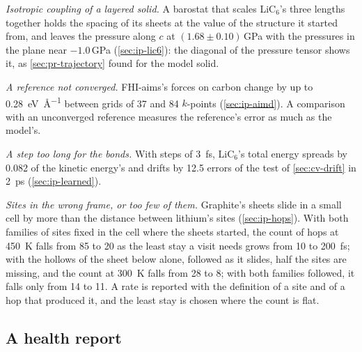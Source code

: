 \textit{Isotropic coupling of a layered solid.} A barostat that scales
LiC$_6$'s three lengths together holds the spacing of its sheets at the
value of the structure it started from, and leaves the pressure along $c$
at $(1.68 \pm 0.10)$\,\si{\giga\pascal} with the pressures in the plane
near $-1.0$\,\si{\giga\pascal} (\cref{sec:ip-lic6}): the diagonal of the
pressure tensor shows it, as \cref{sec:pr-trajectory} found for the model
solid.

\textit{A reference not converged.} FHI-aims's forces on carbon change by
up to \SI{0.28}{\electronvolt\per\angstrom} between grids of 37 and 84
$k$-points (\cref{sec:ip-aimd}). A comparison with an unconverged
reference measures the reference's error as much as the model's.

\textit{A step too long for the bonds.} With steps of
\SI{3}{\femto\second}, LiC$_6$'s total energy spreads by 0.082 of the
kinetic energy's and drifts by 12.5 errors of the test of
\cref{sec:cv-drift} in \SI{2}{\pico\second} (\cref{sec:ip-learned}).

\textit{Sites in the wrong frame, or too few of them.} Graphite's sheets
slide in a small cell by more than the distance between lithium's sites
(\cref{sec:ip-hops}). With both families of sites fixed in the cell where
the sheets started, the count of hops at \SI{450}{\kelvin} falls from 85
to 20 as the least stay a visit needs grows from 10 to
\SI{200}{\femto\second}; with the hollows of the sheet below alone,
followed as it slides, half the sites are missing, and the count at
\SI{300}{\kelvin} falls from 28 to 8; with both families followed, it
falls only from 14 to 11. A rate is reported with the definition of a site
and of a hop that produced it, and the least stay is chosen where the
count is flat.

\subsection*{A health report}

